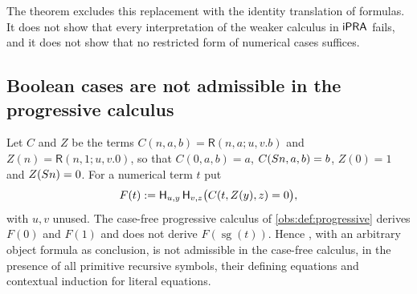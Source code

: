 The theorem excludes this replacement with the identity translation of
formulas. It does not show that every interpretation of the weaker calculus in
$\mathsf{iPRA}$ fails, and it does not show that no restricted form of numerical cases
suffices.

\subsection{Boolean cases are not admissible in the progressive calculus}

\begin{theorem}
\label{obs:thm:boolcases}
Let $C$ and $Z$ be the terms $C(n,a,b)=\mathsf{R}(n,a;u,v.b)$ and
$Z(n)=\mathsf{R}(n,1;u,v.0)$, so that $C(0,a,b)=a$, $C(S n,a,b)=b$,
$Z(0)=1$ and $Z(S n)=0$. For a numerical term $t$ put
\[
F(t)\mathrel{:=}\mathsf{H}_{u,y}\,\mathsf{H}_{v,z}\bigl(C(t,Z(y),z)=0\bigr),
\]
with $u,v$ unused. The case-free progressive calculus of
\cref{obs:def:progressive} derives $F(0)$ and $F(1)$ and does not derive
$F(\operatorname{sg}(t))$. Hence , with an arbitrary object
formula as conclusion, is not admissible in the case-free calculus, in the
presence of all primitive recursive symbols, their defining equations and
contextual induction for literal equations.
\end{theorem}


